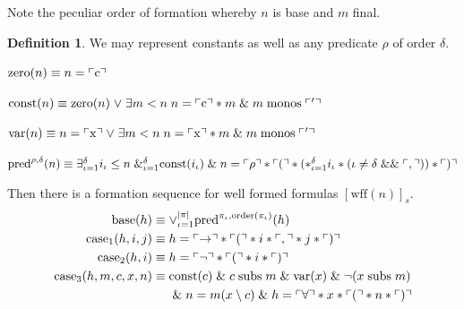 \documentclass{amsbook}
\newcommand{\exis}[1]{\mathord\exists#1\;}
\newcommand{\conj}{\mathrel\&}
\newcommand{\disj}{\mathrel\vee}
\theoremstyle{definition}
\newtheorem{dfn}{Definition}[section]
\begin{document}
Note the peculiar order of formation whereby $n$ is base and $m$ final.

\begin{dfn}
    We may represent constants as well as any predicate $\rho$ of order $\delta$.
    \begin{description}[
            labelindent=\parindent,
            before={
                    \renewcommand\makelabel[1]{(##1).}
                }
        ]
        \item[zero constant] $\mathrm{zero}(n) \equiv n = \ulcorner\mathrm c\urcorner$
        \item[constant] $\const(n) \equiv \mathrm{zero}(n) \disj \exis{m < n} n = \ord {\mathrm c} * m \conj m \monos \ord'$
        \item[variable] $\mathrm{var}(n) \equiv n = \ord{\mathrm x} \disj \exis{m < n} n = \ord {\mathrm x} * m \conj m \monos \ord'$
        \item[predicative formula] $\pred^{\rho, \delta}(n) \equiv \mathord\exists_{\iota = 1}^\delta i_\iota \leq n\; \&_{\iota = 1}^\delta \const(i_\iota)
                  \\\conj n = \ord\rho * \ord( * (*_{\iota = 1}^\delta i_\iota * (\iota \neq \delta \mathrel{\&\&} \ord{,})) * \ord)$
    \end{description}
    Then there is a formation sequence for well formed formulas $[\mathrm{wff}(n)]_s$.
    \begin{align*}
        \mathrm{base}(h) \equiv\;               & \mathord\vee_{\iota=1}^{|\pi|} \pred^{\pi_\iota, \mathrm{order}(\pi_\iota)}(h) \\
        \mathrm{case}_1(h, i, j) \equiv\;       & h = \ord{\rightarrow} * \ord( * i * \ord, * j * \ord)                          \\
        \mathrm{case}_2(h, i) \equiv\;          & h = \ord{\neg} * \ord( * i * \ord)                                             \\
        \mathrm{case}_3(h, m, c, x, n) \equiv\; & \const(c) \conj c \subs m \conj \mathrm{var}(x) \conj \neg(x \subs m)          \\
                                                & \conj n = m(x \setminus c) \conj h = \ord{\forall} * x * \ord( * n * \ord)
    \end{align*}
\end{dfn}
\end{document}

